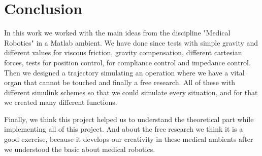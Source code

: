 \section{Conclusion}

In this work we worked with the main ideas from the discipline "Medical Robotics" in a Matlab ambient. We have done since tests with simple gravity and different values for viscous friction, gravity compensation, different cartesian forces, tests for position control, for compliance control and impedance control. Then we designed a trajectory simulating an operation where we have a vital organ that cannot be touched and finally a free research. All of these with different simulink schemes so that we could simulate every situation, and for that we created many different functions.

Finally, we think this project helped us to understand the theoretical part while implementing all of this project. And about the free research we think it is a good exercise, because it develops our creativity in these medical ambients after we understood the basic about medical robotics.